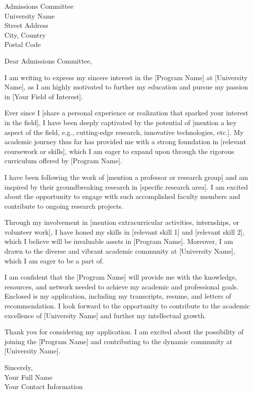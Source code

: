 \documentclass[a4paper,10pt]{letter}
\begin{document}
\begin{letter}{%
    Admissions Committee \\
    University Name \\
    Street Address \\
    City, Country \\
    Postal Code
}

\opening{Dear Admissions Committee,}
I am writing to express my sincere interest in the [Program Name] at [University Name], as I am highly motivated to further my education and pursue my passion in [Your Field of Interest].

Ever since I [share a personal experience or realization that sparked your interest in the field], I have been deeply captivated by the potential of [mention a key aspect of the field, e.g., cutting-edge research, innovative technologies, etc.]. My academic journey thus far has provided me with a strong foundation in [relevant coursework or skills], which I am eager to expand upon through the rigorous curriculum offered by [Program Name].

I have been following the work of [mention a professor or research group] and am inspired by their groundbreaking research in [specific research area]. I am excited about the opportunity to engage with such accomplished faculty members and contribute to ongoing research projects.

Through my involvement in [mention extracurricular activities, internships, or volunteer work], I have honed my skills in [relevant skill 1] and [relevant skill 2], which I believe will be invaluable assets in [Program Name]. Moreover, I am drawn to the diverse and vibrant academic community at [University Name], which I am eager to be a part of.

I am confident that the [Program Name] will provide me with the knowledge, resources, and network needed to achieve my academic and professional goals. Enclosed is my application, including my transcripts, resume, and letters of recommendation. I look forward to the opportunity to contribute to the academic excellence of [University Name] and further my intellectual growth.

Thank you for considering my application. I am excited about the possibility of joining the [Program Name] and contributing to the dynamic community at [University Name].

Sincerely, \\
Your Full Name \\
Your Contact Information

\end{letter}
\end{document}
